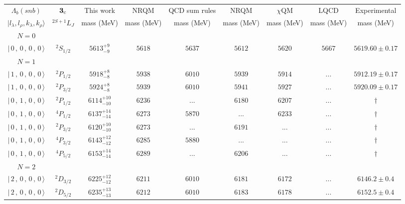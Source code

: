 \begin{tabular}{c c| c c c c c c c}\hline \hline
$\Lambda_{b}(snb)$& ${\bf {3}}_{\rm c}$& This work   &   NRQM \cite{Yoshida2015}     &  QCD sum rules \cite{Liu2008, Mao2015, Chen2016}      &  NRQM \cite{Roberts2008}    & $\chi$QM \cite{Kim2021}        & LQCD \cite{Mohanta2020}     & Experimental  \\ 
 $\vert l_{\lambda}, l_{\rho}, k_{\lambda}, k_{\rho} \rangle$ & $^{2S+1}L_{J}$ & mass (MeV)  &   mass (MeV)  &  mass (MeV)  &  mass (MeV) & mass (MeV) & mass (MeV) &      mass (MeV) \\ \hline
\hline
 $N=0$  &  &  &  &  &  \\ 
$\vert \,0\,,\,0\,,\,0\,,\,0 \,\rangle $ & $^{2}S_{1/2}$ & $5613^{+9}_{-9}$ & $5618$ & $5637$ & $5612$ & $5620$ & $5667$ & $5619.60\pm 0.17$ \\ 
\hline
 $N=1$  &  &  &  &  &  \\ 
$\vert \,1\,,\,0\,,\,0\,,\,0 \,\rangle $ & $^{2}P_{1/2}$ & $5918^{+8}_{-8}$ & $5938$ & $6010$ & $5939$ & $5914$ & ... & $5912.19\pm 0.17$ \\ 
$\vert \,1\,,\,0\,,\,0\,,\,0 \,\rangle $ & $^{2}P_{3/2}$ & $5924^{+8}_{-8}$ & $5939$ & $6010$ & $5941$ & $5927$ & ... & $5920.09\pm 0.17$ \\ 
$\vert \,0\,,\,1\,,\,0\,,\,0 \,\rangle $ & $^{2}P_{1/2}$ & $6114^{+10}_{-10}$ & $6236$ & ... & $6180$ & $6207$ & ... & $\dagger$ \\ 
$\vert \,0\,,\,1\,,\,0\,,\,0 \,\rangle $ & $^{4}P_{1/2}$ & $6137^{+14}_{-14}$ & $6273$ & $5870$ & ... & $6233$ & ... & $\dagger$ \\ 
$\vert \,0\,,\,1\,,\,0\,,\,0 \,\rangle $ & $^{2}P_{3/2}$ & $6120^{+10}_{-10}$ & $6273$ & ... & $6191$ & ... & ... & $\dagger$ \\ 
$\vert \,0\,,\,1\,,\,0\,,\,0 \,\rangle $ & $^{4}P_{3/2}$ & $6143^{+12}_{-12}$ & $6285$ & $5880$ & ... & ... & ... & $\dagger$ \\ 
$\vert \,0\,,\,1\,,\,0\,,\,0 \,\rangle $ & $^{4}P_{5/2}$ & $6153^{+14}_{-14}$ & $6289$ & ... & $6206$ & ... & ... & $\dagger$ \\ 
\hline
 $N=2$  &  &  &  &  &  \\ 
$\vert \,2\,,\,0\,,\,0\,,\,0 \,\rangle $ & $^{2}D_{3/2}$ & $6225^{+12}_{-12}$ & $6211$ & $6010$ & $6181$ & $6172$ & ... & $6146.2\pm 0.4$ \\ 
$\vert \,2\,,\,0\,,\,0\,,\,0 \,\rangle $ & $^{2}D_{5/2}$ & $6235^{+13}_{-13}$ & $6212$ & $6010$ & $6183$ & $6178$ & ... & $6152.5\pm 0.4$ \\ 

\end{tabular}
